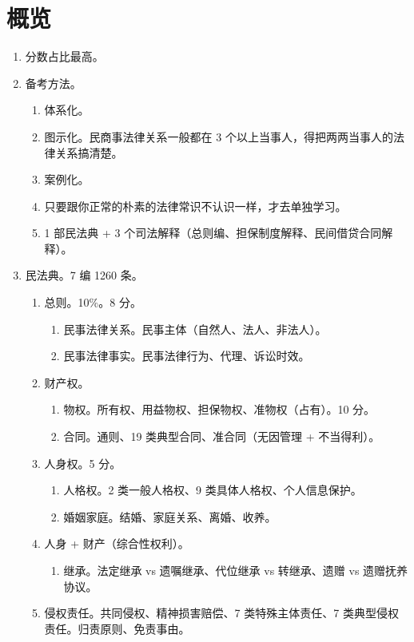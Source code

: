 \section{概览}
\begin{enumerate}
  \item 分数占比最高。
  \item  备考方法。
        \begin{enumerate}
          \item 体系化。
          \item 图示化。民商事法律关系一般都在 3 个以上当事人，得把两两当事人的法律关系搞清楚。
          \item 案例化。
          \item 只要跟你正常的朴素的法律常识不认识一样，才去单独学习。
          \item 1 部民法典 + 3 个司法解释（总则编、担保制度解释、民间借贷合同解释）。
        \end{enumerate}
  \item 民法典。7 编 1260 条。
        \begin{enumerate}
          \item 总则。10\%。8 分。
                \begin{enumerate}
                  \item 民事法律关系。民事主体（自然人、法人、非法人）。
                  \item 民事法律事实。民事法律行为、代理、诉讼时效。
                \end{enumerate}
          \item 财产权。
                \begin{enumerate}
                  \item 物权。所有权、用益物权、担保物权、准物权（占有）。10 分。
                  \item 合同。通则、19 类典型合同、准合同（无因管理 + 不当得利）。
                \end{enumerate}
          \item 人身权。5 分。
                \begin{enumerate}
                  \item 人格权。2 类一般人格权、9 类具体人格权、个人信息保护。
                  \item 婚姻家庭。结婚、家庭关系、离婚、收养。
                \end{enumerate}
          \item 人身 + 财产（综合性权利）。
                \begin{enumerate}
                  \item 继承。法定继承 vs 遗嘱继承、代位继承 vs 转继承、遗赠 vs 遗赠抚养协议。
                \end{enumerate}
          \item 侵权责任。共同侵权、精神损害赔偿、7 类特殊主体责任、7 类典型侵权责任。归责原则、免责事由。
        \end{enumerate}
\end{enumerate}
